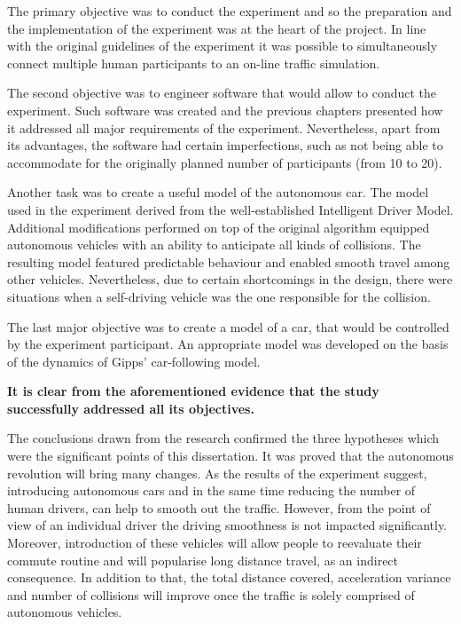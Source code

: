 \documentclass[11pt,english]{article}
\begin{document}
The primary objective was to conduct the experiment and so the preparation and the implementation of the experiment was at the heart of the project. In line with the original guidelines of the experiment it was possible to simultaneously connect multiple human
participants to an on-line traffic simulation.

The second objective was to engineer software that would allow to conduct the experiment. Such software was created and the previous chapters presented how it addressed all major requirements of the experiment. Nevertheless, apart from its advantages, the software had certain imperfections, such as not being able to accommodate for the originally planned number of participants (from 10 to 20).

Another task was to create a useful model of the autonomous car. The model used in the experiment derived from the well-established Intelligent Driver Model. Additional modifications performed on top of the original algorithm equipped autonomous vehicles with an ability to anticipate all kinds of collisions. The resulting model featured predictable behaviour and enabled smooth travel among other vehicles. Nevertheless, due to certain shortcomings in the design, there were situations when a self-driving vehicle was the one responsible for the collision.

The last major objective was to create a model of a car, that would be controlled by the
experiment participant. An appropriate model was developed on the basis of the dynamics
of Gipps’ car-following model.


\textbf{It is clear from the aforementioned evidence that the study successfully addressed all its objectives.} 

\par

The conclusions drawn from the research confirmed the three hypotheses which were the significant  points of this dissertation. It was proved that the autonomous revolution will bring many changes. As the results of the experiment suggest, introducing autonomous cars and in the same time reducing the number of human drivers, can help to smooth out the traffic. However, from the point of view of an individual driver the driving smoothness is not impacted significantly. Moreover, introduction of these vehicles will allow people to reevaluate their commute routine and will popularise long distance travel, as an indirect consequence. In addition to that, the total distance covered, acceleration variance and number of collisions will improve once the traffic is solely comprised of autonomous vehicles. 
\end{document}
